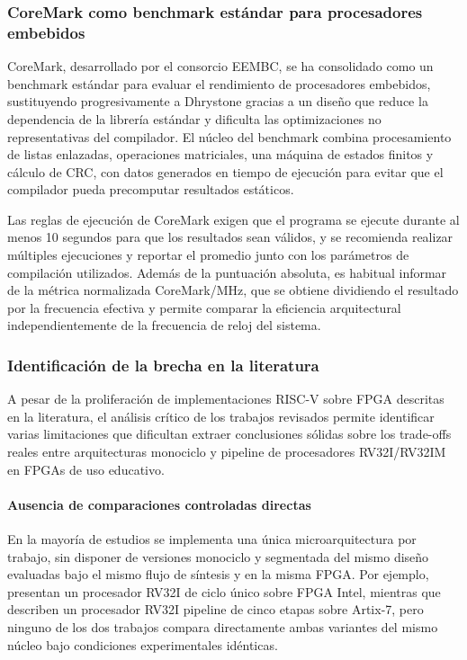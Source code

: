\subsubsection{CoreMark como benchmark estándar para procesadores embebidos}

CoreMark, desarrollado por el consorcio EEMBC, se ha consolidado como un
benchmark estándar para evaluar el rendimiento de procesadores embebidos,
sustituyendo progresivamente a Dhrystone gracias a un diseño que reduce la
dependencia de la librería estándar y dificulta las optimizaciones no
representativas del compilador.\parencite{eembc_nd_coremark,arm2022coremark}
El núcleo del benchmark combina procesamiento de listas enlazadas, operaciones
matriciales, una máquina de estados finitos y cálculo de CRC, con datos
generados en tiempo de ejecución para evitar que el compilador pueda
precomputar resultados estáticos.

Las reglas de ejecución de CoreMark exigen que el programa se ejecute durante
al menos 10 segundos para que los resultados sean válidos, y se recomienda
realizar múltiples ejecuciones y reportar el promedio junto con los parámetros
de compilación utilizados.
Además de la puntuación absoluta, es habitual informar de la métrica
normalizada CoreMark/MHz, que se obtiene dividiendo el resultado por la
frecuencia efectiva y permite comparar la eficiencia arquitectural
independientemente de la frecuencia de reloj del
sistema.


\subsubsection{Identificación de la brecha en la literatura}

A pesar de la proliferación de implementaciones RISC-V sobre FPGA descritas
en la literatura, el análisis crítico de los trabajos revisados permite
identificar varias limitaciones que dificultan extraer conclusiones sólidas
sobre los trade-offs reales entre arquitecturas monociclo y pipeline de
procesadores RV32I/RV32IM en FPGAs de uso educativo.
\parencite{Heinz2019Catalog,Goh2024UTHMRISCV}


\paragraph{Ausencia de comparaciones controladas directas}

En la mayoría de estudios se implementa una única microarquitectura por trabajo,
sin disponer de versiones monociclo y segmentada del mismo diseño evaluadas
bajo el mismo flujo de síntesis y en la misma FPGA.
\parencite{Goh2024UTHMRISCV}
Por ejemplo, \textcite{Goh2024UTHMRISCV} presentan un procesador RV32I de
ciclo único sobre FPGA Intel, mientras que \textcite{Wei2024NEORV32} describen un
procesador RV32I pipeline de cinco etapas sobre Artix-7, pero ninguno de los
dos trabajos compara directamente ambas variantes del mismo núcleo bajo
condiciones experimentales idénticas.

